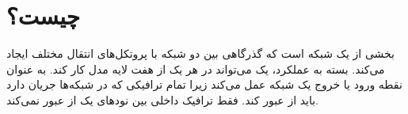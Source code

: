 \documentclass{article}
\begin{document}
\section{ چیست؟}
 بخشی از یک شبکه است که گذرگاهی بین دو شبکه با پروتکل‌های انتقال مختلف ایجاد می‌کند. بسته به عملکرد، یک  می‌تواند در هر یک از هفت لایه مدل  کار کند.  به عنوان نقطه ورود یا خروج یک شبکه عمل می‌کند زیرا تمام ترافیکی که در شبکه‌ها جریان دارد باید از  عبور کند. فقط ترافیک داخلی بین نودهای یک  از  عبور نمی‌کند. 
 
\end{document}
